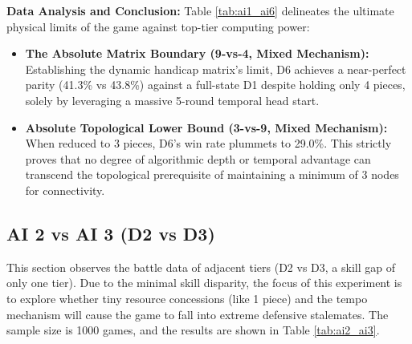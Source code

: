 \textbf{Data Analysis and Conclusion:} 
Table \ref{tab:ai1_ai6} delineates the ultimate physical limits of the game against top-tier computing power:
\begin{itemize}
    \item \textbf{The Absolute Matrix Boundary (9-vs-4, Mixed Mechanism):} Establishing the dynamic handicap matrix's limit, D6 achieves a near-perfect parity (41.3\% vs 43.8\%) against a full-state D1 despite holding only 4 pieces, solely by leveraging a massive 5-round temporal head start.
    \item \textbf{Absolute Topological Lower Bound (3-vs-9, Mixed Mechanism):} When reduced to 3 pieces, D6's win rate plummets to 29.0\%. This strictly proves that no degree of algorithmic depth or temporal advantage can transcend the topological prerequisite of maintaining a minimum of 3 nodes for connectivity.
\end{itemize}

\subsection{AI 2 vs AI 3 (D2 vs D3)}
\label{subsec:ai2_ai3}

This section observes the battle data of adjacent tiers (D2 vs D3, a skill gap of only one tier). Due to the minimal skill disparity, the focus of this experiment is to explore whether tiny resource concessions (like 1 piece) and the tempo mechanism will cause the game to fall into extreme defensive stalemates. The sample size is 1000 games, and the results are shown in Table \ref{tab:ai2_ai3}.

\begin{table}[htbp]
    \centering
    \caption{AI 2 vs AI 3 Simulation Data Distribution (Sample Size=1000)}
    \label{tab:ai2_ai3}
\end{table}

